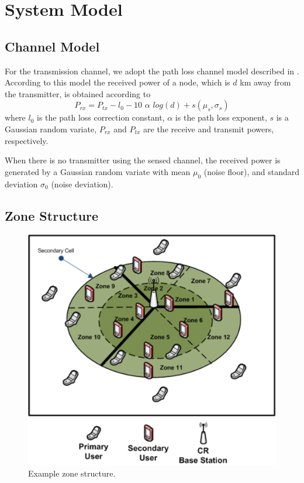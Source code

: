 \documentclass[conference,compsoc]{IEEEtran}
\newcommand{\beqn}{\begin{equation}}
\newcommand{\eeqn}{\end{equation}}
\begin{document}
\section{\label{sec:system_model}System Model}

\subsection{Channel Model}
\newpage
For the transmission channel, we adopt the path loss channel model described in \cite{faramir}. According to this model the received power of a node, which is $d$ km away from the transmitter, is obtained according to\\
\beqn
    P_{rx} = P_{tx} - l_0 - 10\,\, \alpha \,\, log(d) + s(\mu_s, \sigma_s)
\eeqn
where $l_0$ is the path loss correction constant, $\alpha$ is the path loss exponent, $s$ is a Gaussian random variate,  $P_{rx}$ and $P_{tx}$ are the receive and transmit powers, respectively.

When there is no transmitter using the sensed channel, the received power is generated by a Gaussian random variate with mean $\mu_0$ (noise floor), and standard deviation $\sigma_0$ (noise deviation).

\subsection{Zone Structure}

\begin{figure}[!htb]
\centering
\includegraphics[width=0.99\columnwidth,keepaspectratio] {figs/cellStructure.eps}
\caption{Example zone structure.} \label{fig:zone_structure}
\end{figure}
\end{document}
